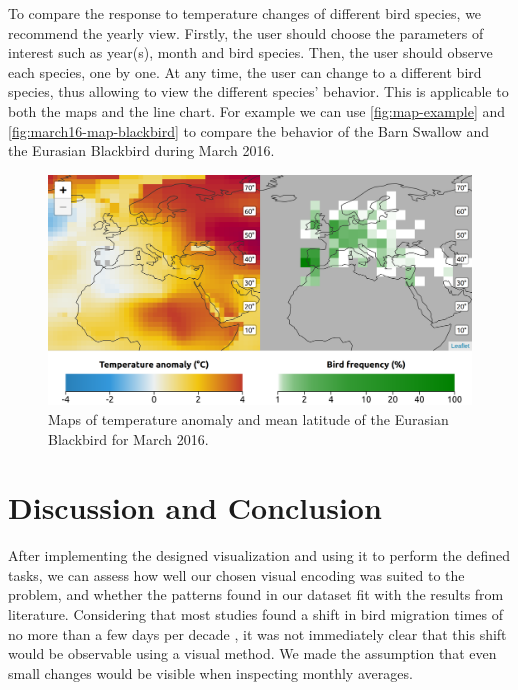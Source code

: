 \documentclass[journal]{vgtc}                %
\begin{document}
To compare the response to temperature changes of different bird species, we recommend the yearly view. Firstly, the user should choose the parameters of interest such as year(s), month and bird species. Then, the user should observe each species, one by one. At any time, the user can change to a different bird species, thus allowing to view the different species' behavior. This is applicable to both the maps and the line chart. For example we can use \autoref{fig:map-example} and \autoref{fig:march16-map-blackbird} to compare the behavior of the Barn Swallow and the Eurasian Blackbird during March 2016.

\begin{figure}[t]
  \centering
  \includegraphics[width=\linewidth]{march16-map-blackbird}
  \caption{Maps of temperature anomaly and mean latitude of the Eurasian Blackbird for March 2016.}
  \label{fig:march16-map-blackbird}
\end{figure}

\section{Discussion and Conclusion}


After implementing the designed visualization and using it to perform the defined tasks, we can assess how well our chosen visual encoding was suited to the problem, and whether the patterns found in our dataset fit with the results from literature. Considering that most studies found a shift in bird migration times of no more than a few days per decade \cite{marra2005influence,huppop2003north,cotton2003avian}, it was not immediately clear that this shift would be observable using a visual method. We made the assumption that even small changes would be visible when inspecting monthly averages.
\end{document}
